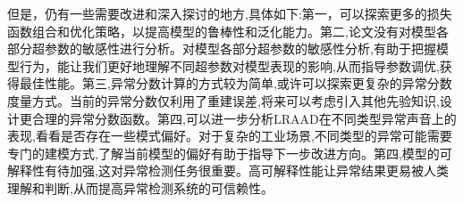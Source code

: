 \documentclass{article}
\begin{document}
 但是，仍有一些需要改进和深入探讨的地方,具体如下:第一，可以探索更多的损失函数组合和优化策略，以提高模型的鲁棒性和泛化能力。第二,论文没有对模型各部分超参数的敏感性进行分析。对模型各部分超参数的敏感性分析,有助于把握模型行为，能让我们更好地理解不同超参数对模型表现的影响,从而指导参数调优,获得最佳性能。第三,异常分数计算的方式较为简单,或许可以探索更复杂的异常分数度量方式。当前的异常分数仅利用了重建误差,将来可以考虑引入其他先验知识,设计更合理的异常分数函数。第四,可以进一步分析LRAAD在不同类型异常声音上的表现,看看是否存在一些模式偏好。对于复杂的工业场景,不同类型的异常可能需要专门的建模方式,了解当前模型的偏好有助于指导下一步改进方向。第四,模型的可解释性有待加强,这对异常检测任务很重要。高可解释性能让异常结果更易被人类理解和判断,从而提高异常检测系统的可信赖性。


\end{document}
